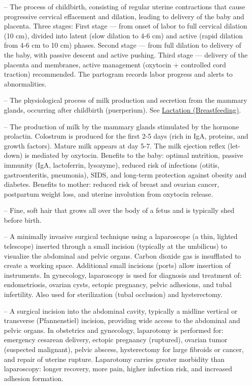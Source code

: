 -- The process of childbirth, consisting of regular uterine contractions that cause progressive cervical effacement and dilation, leading to delivery of the baby and placenta. Three stages: First stage — from onset of labor to full cervical dilation (10 cm), divided into latent (slow dilation to 4-6 cm) and active (rapid dilation from 4-6 cm to 10 cm) phases. Second stage — from full dilation to delivery of the baby, with passive descent and active pushing. Third stage — delivery of the placenta and membranes, active management (oxytocin + controlled cord traction) recommended. The partogram records labor progress and alerts to abnormalities.

-- The physiological process of milk production and secretion from the mammary glands, occurring after childbirth (puerperium). See \hyperlink{Lactation (Breastfeeding)}{Lactation (Breastfeeding)}.

-- The production of milk by the mammary glands stimulated by the hormone prolactin. Colostrum is produced for the first 2-5 days (rich in IgA, proteins, and growth factors). Mature milk appears at day 5-7. The milk ejection reflex (let-down) is mediated by oxytocin. Benefits to the baby: optimal nutrition, passive immunity (IgA, lactoferrin, lysozyme), reduced risk of infections (otitis, gastroenteritis, pneumonia), SIDS, and long-term protection against obesity and diabetes. Benefits to mother: reduced risk of breast and ovarian cancer, postpartum weight loss, and uterine involution from oxytocin release.

-- Fine, soft hair that grows all over the body of a fetus and is typically shed before birth.

-- A minimally invasive surgical technique using a laparoscope (a thin, lighted telescope) inserted through a small incision (typically at the umbilicus) to visualize the abdominal and pelvic organs. Carbon dioxide gas is insufflated to create a working space. Additional small incisions (ports) allow insertion of instruments. In gynecology, laparoscopy is used for diagnosis and treatment of: endometriosis, ovarian cysts, ectopic pregnancy, pelvic adhesions, and tubal infertility. Also used for sterilization (tubal occlusion) and hysterectomy.

-- A surgical incision into the abdominal cavity, typically a midline vertical or transverse (Pfannenstiel) incision, providing wide access to the abdominal and pelvic organs. In obstetrics and gynecology, laparotomy is performed for: emergency cesarean delivery, ectopic pregnancy (ruptured), ovarian tumor (suspected malignant), pelvic abscess, hysterectomy for large fibroids or cancer, and repair of uterine rupture. Laparotomy carries greater morbidity than laparoscopy: longer recovery, more pain, higher infection risk, and increased adhesion formation.

